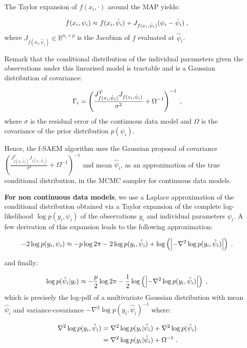 The Taylor expansion of $f(x_{i},\cdot)$ around the MAP yields:

\begin{equation}
f(x_{i},\psi_i) \approx f(x_{i},\hat{\psi}_i) + J_{f(x_{i},\hat{\psi}_i)}(\psi_i - \hat{\psi}_i)\;,
\end{equation}
where $J_{f(x_{i},\hat{\psi}_i)} \in \mathbb{R}^{n_i \times p}$ is the Jacobian of $f$ evaluated at $\hat{\psi}_i$. 

Remark that the conditional distribution of the individual parameters given the observations under this linearised model is tractable and is a Gaussian distribution of covariance:


\begin{equation}
\Gamma_i =\left(\frac{ J_{f(x_{i},\hat{\psi}_i)}^T J_{f(x_{i},\hat{\psi}_i)} }{\sigma^2} + \Omega^{-1}\right)^{-1} \;,
\end{equation}
where $\sigma$ is the residual error of the continuous data model and $\Omega$ is the covariance of the prior distribution $p(\psi_i)$.

Hence, the f-SAEM algorithm uses the Gaussian proposal of covariance $\left(\frac{ J_{f(x_{i},\hat{\psi}_i)}^T J_{f(x_{i},\hat{\psi}_i)} }{\sigma^2} + \Omega^{-1}\right)^{-1}$ and  mean $\hat{\psi}_i$, as an approximation of the true conditional distribution, in the MCMC sampler for continuous data models.

\textbf{For non continuous data models}, we use a Laplace approximation of the conditional distribution obtained via a Taylor expansion of the complete log-likelihood $\log p(y_i,\psi_i)$ of the observations $y_i$ and individual parameters $\psi_i$.
A few derivation of this expansion leads to the following approximation:

$$
-2\log p(y_i,\psi_i)  \approx -p\log2\pi - 2\log p(y_i,\hat{\psi}_i) + \log \left(\left|-\nabla^2 \log p(y_i,\hat{\psi}_i)\right|\right)\;.
$$

and finally:

 $$
\log p(\hat{\psi}_i|y_i) \approx -\frac{p}{2}\log2\pi  -\frac{1}{2}\log \left(\left|-\nabla^2 \log p(y_i,\hat{\psi}_i) \right|\right)\;,
$$
which is precisely the log-pdf of a multivariate Gaussian distribution with mean $\hat{\psi}_i$ and  variance-covariance $-\nabla^2 \log p(y_i,\hat{\psi}_i)^{-1}$ where:

\begin{align}
\nabla^2 \log p(y_i,\hat{\psi}_i) &= \nabla^2 \log p(y_i|\hat{\psi}_i) + \nabla^2 \log p(\hat{\psi}_i) \\ \notag
&= \nabla^2 \log p(y_i|\hat{\psi}_i) + \Omega^{-1}\;.\notag
\end{align}

